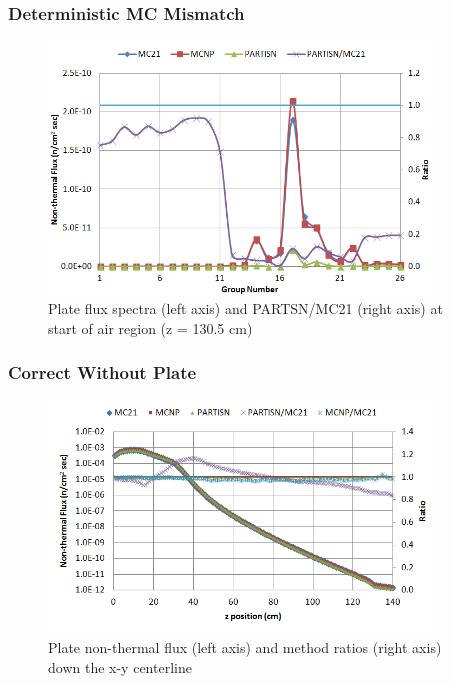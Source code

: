 \documentclass[xcolor=x11names,compress]{beamer}
\renewcommand{\(}{\begin{columns}}
\renewcommand{\)}{\end{columns}}
\newcommand{\<}[1]{\begin{column}{#1}}
\renewcommand{\>}{\end{column}}
\begin{document}
\begin{frame}[fragile]
  \frametitle{Deterministic MC Mismatch}
 \begin{figure}[p]
   \begin{center}
     \includegraphics[width=4in,clip]{NSE13-109R1-PlateExitSpectra}
   \end{center}
   \caption{Plate flux spectra (left axis) and PARTSN/MC21 (right axis) at start of air region (z = 130.5 cm)}
   \label{fig:PlateExit}
 \end{figure}
\end{frame}

\begin{frame}[fragile]
  \frametitle{Correct Without Plate}
 \begin{figure}[p]
   \begin{center}
     \includegraphics[width=4in,clip]{NSE13-109R1-NoPlateFluxExcel}
   \end{center}
   \caption{Plate non-thermal flux (left axis) and method ratios (right axis) down the x-y centerline}
   \label{fig:noPlateFlux}
 \end{figure}
\end{frame}
\end{document}
